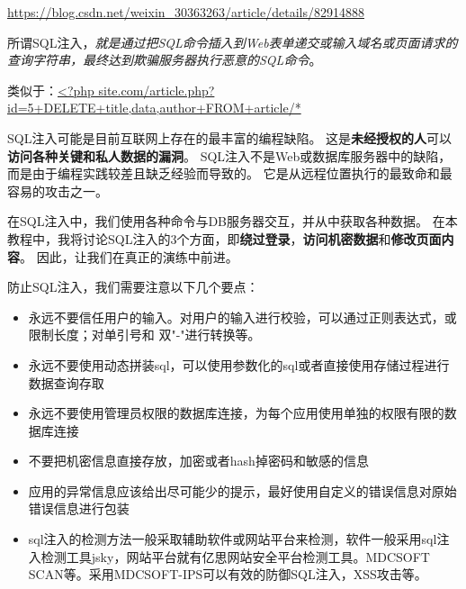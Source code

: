 \documentclass[UTF8,a4paper,12pt]{ctexbook}
\begin{document}
		\url{https://blog.csdn.net/weixin_30363263/article/details/82914888}
		
		所谓SQL注入，\textit{就是通过把SQL命令插入到Web表单递交或输入域名或页面请求的查询字符串，最终达到欺骗服务器执行恶意的SQL命令}。
		
		类似于：\url{<?php site.com/article.php?id=5+DELETE+title,data,author+FROM+article/*}
	
		SQL注入可能是目前互联网上存在的最丰富的编程缺陷。 这是\textbf{未经授权的人}可以\textbf{访问各种关键和私人数据的漏洞}。 SQL注入不是Web或数据库服务器中的缺陷，而是由于编程实践较差且缺乏经验而导致的。 它是从远程位置执行的最致命和最容易的攻击之一。
		
		在SQL注入中，我们使用各种命令与DB服务器交互，并从中获取各种数据。 在本教程中，我将讨论SQL注入的3个方面，即\textbf{绕过登录}，\textbf{访问机密数据}和\textbf{修改页面内容}。 因此，让我们在真正的演练中前进。	
	
		防止SQL注入，我们需要注意以下几个要点：
		\begin{itemize}
			\item 永远不要信任用户的输入。对用户的输入进行校验，可以通过正则表达式，或限制长度；对单引号和 双"-"进行转换等。
			\item 永远不要使用动态拼装sql，可以使用参数化的sql或者直接使用存储过程进行数据查询存取
			\item 永远不要使用管理员权限的数据库连接，为每个应用使用单独的权限有限的数据库连接
			\item 不要把机密信息直接存放，加密或者hash掉密码和敏感的信息
			\item 应用的异常信息应该给出尽可能少的提示，最好使用自定义的错误信息对原始错误信息进行包装
			\item sql注入的检测方法一般采取辅助软件或网站平台来检测，软件一般采用sql注入检测工具jsky，网站平台就有亿思网站安全平台检测工具。MDCSOFT SCAN等。采用MDCSOFT-IPS可以有效的防御SQL注入，XSS攻击等。
		\end{itemize}    
\end{document}
